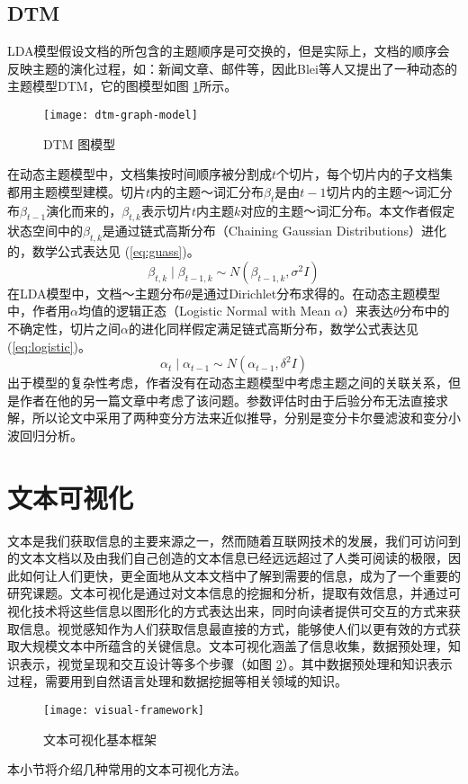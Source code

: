 \subsection{DTM}
\label{intro-dtm}
LDA模型假设文档的所包含的主题顺序是可交换的，但是实际上，文档的顺序会反映主题的演化过程，如：新闻文章、邮件等，因此Blei等人\cite{Blei:2006}又提出了一种动态的主题模型DTM，它的图模型如图 \ref{fig:dtm-graph-model}所示。
\begin{figure}[htb]
    \centering%
    \texttt{[image: dtm-graph-model]}
    \caption{DTM 图模型}
    \label{fig:dtm-graph-model}
\end{figure}


在动态主题模型中，文档集按时间顺序被分割成$t$个切片，每个切片内的子文档集都用主题模型建模。切片$t$内的主题～词汇分布$\beta_t$是由$t-1$切片内的主题～词汇分布$\beta_{t-1}$演化而来的，$\beta_{t,k}$表示切片$t$内主题$k$对应的主题～词汇分布。本文作者假定状态空间中的$\beta_{t,k}$是通过链式高斯分布（Chaining Gaussian Distributions）进化的，数学公式表达见 (\ref{eq:guass})。
\begin{equation}
\label{eq:guass}
\beta_{t,k} \mid \beta_{t-1,k} \sim N \left( \beta_{t-1,k}, \sigma^2 I \right)
\end{equation}
在LDA模型中，文档～主题分布$\theta$是通过Dirichlet分布求得的。在动态主题模型中，作者用$\alpha$均值的逻辑正态（Logistic Normal with Mean $\alpha$）来表达$\theta$分布中的不确定性，切片之间$\alpha$的进化同样假定满足链式高斯分布，数学公式表达见 (\ref{eq:logistic})。
\begin{equation}
\label{eq:logistic}
\alpha_t \mid \alpha_{t-1} \sim N \left( \alpha_{t-1}, \delta ^2 I \right)
\end{equation}
出于模型的复杂性考虑，作者没有在动态主题模型中考虑主题之间的关联关系，但是作者在他的另一篇文章\cite{lafferty2005correlated}中考虑了该问题。参数评估时由于后验分布无法直接求解，所以论文中采用了两种变分方法来近似推导，分别是变分卡尔曼滤波和变分小波回归分析。

\section{文本可视化}
文本是我们获取信息的主要来源之一，然而随着互联网技术的发展，我们可访问到的文本文档以及由我们自己创造的文本信息已经远远超过了人类可阅读的极限，因此如何让人们更快，更全面地从文本文档中了解到需要的信息，成为了一个重要的研究课题。文本可视化是通过对文本信息的挖掘和分析，提取有效信息，并通过可视化技术将这些信息以图形化的方式表达出来，同时向读者提供可交互的方式来获取信息。视觉感知作为人们获取信息最直接的方式，能够使人们以更有效的方式获取大规模文本中所蕴含的关键信息。文本可视化涵盖了信息收集，数据预处理，知识表示，视觉呈现和交互设计等多个步骤（如图 \ref{fig:visual-framework}）。其中数据预处理和知识表示过程，需要用到自然语言处理和数据挖掘等相关领域的知识。
\begin{figure}[htb]
    \centering%
    \texttt{[image: visual-framework]}
    \caption{文本可视化基本框架}
    \label{fig:visual-framework}
\end{figure}
本小节将介绍几种常用的文本可视化方法。

